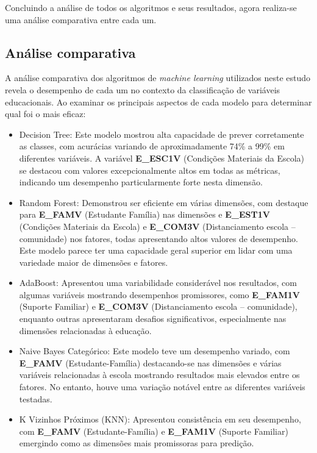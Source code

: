 Concluindo a análise de todos os algoritmos e seus resultados, agora realiza-se uma análise comparativa entre cada um.



\subsection{Análise comparativa}



A análise comparativa dos algoritmos de \textit{machine learning} utilizados neste estudo revela o desempenho de cada um no contexto da classificação de variáveis educacionais. Ao examinar os principais aspectos de cada modelo para determinar qual foi o mais eficaz:

\begin{itemize}
    \item Decision Tree: Este modelo mostrou alta capacidade de prever corretamente as classes, com acurácias variando de aproximadamente 74\% a 99\% em diferentes variáveis. A variável \textbf{E\_ESC1V} (Condições Materiais da Escola) se destacou com valores excepcionalmente altos em todas as métricas, indicando um desempenho particularmente forte nesta dimensão.

    \item Random Forest: Demonstrou ser eficiente em várias dimensões, com destaque para \textbf{E\_FAMV} (Estudante Família) nas dimensões e \textbf{E\_EST1V} (Condições Materiais da Escola) e \textbf{E\_COM3V} (Distanciamento escola – comunidade) nos fatores, todas apresentando altos valores de desempenho. Este modelo parece ter uma capacidade geral superior em lidar com uma variedade maior de dimensões e fatores.

    \item AdaBoost: Apresentou uma variabilidade considerável nos resultados, com algumas variáveis mostrando desempenhos promissores, como \textbf{E\_FAM1V} (Suporte Familiar) e \textbf{E\_COM3V} (Distanciamento escola – comunidade), enquanto outras apresentaram desafios significativos, especialmente nas dimensões relacionadas à educação.

    \item Naive Bayes Categórico: Este modelo teve um desempenho variado, com \textbf{E\_FAMV} (Estudante-Família) destacando-se nas dimensões e várias variáveis relacionadas à escola mostrando resultados mais elevados entre os fatores. No entanto, houve uma variação notável entre as diferentes variáveis testadas.

    \item K Vizinhos Próximos (KNN): Apresentou consistência em seu desempenho, com \textbf{E\_FAMV} (Estudante-Família) e \textbf{E\_FAM1V} (Suporte Familiar) emergindo como as dimensões mais promissoras para predição.
\end{itemize}



